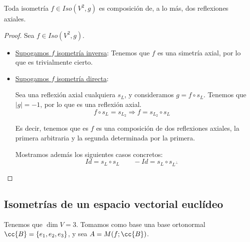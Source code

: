 \begin{teo}
    Toda isometría $f\in Iso(V^2, g)$ es composición de, a lo más, dos reflexiones axiales.
\end{teo}
\begin{proof}
    Sea $f\in Iso(V^2, g)$.

    \begin{itemize}
        \item \underline{Supogamos $f$ isometría inversa}: Tenemos que $f$ es una simetría axial, por lo que es trivialmente cierto.

        \item \underline{Supogamos $f$ isometría directa}:

        Sea una reflexión axial cualquiera $s_L$, y consideramos $g=f\circ s_L$. Tenemos que $|g|=-1$, por lo que es una reflexión axial.
        \begin{equation*}
            f\circ s_L = s_{L_2} \Longrightarrow f = s_{L_2}\circ s_L
        \end{equation*}

        Es decir, tenemos que es $f$ es una composición de dos reflexiones axiales, la primera arbitraria y la segunda determinada por la primera.

        Mostramos además los siguientes casos concretos:
        \begin{equation*}
            Id = s_{L}\circ s_{L}
            \qquad
            -Id = s_{L}\circ s_{L^\perp}
        \end{equation*}
        
    \end{itemize}
\end{proof}





\subsection{Isometrías de un espacio vectorial euclídeo}
Tenemos que $\dim V = 3$. Tomamos como base una base ortonormal $\cc{B}=\{e_1, e_2, e_3\}$, y sea $A=M(f; \cc{B})$.
